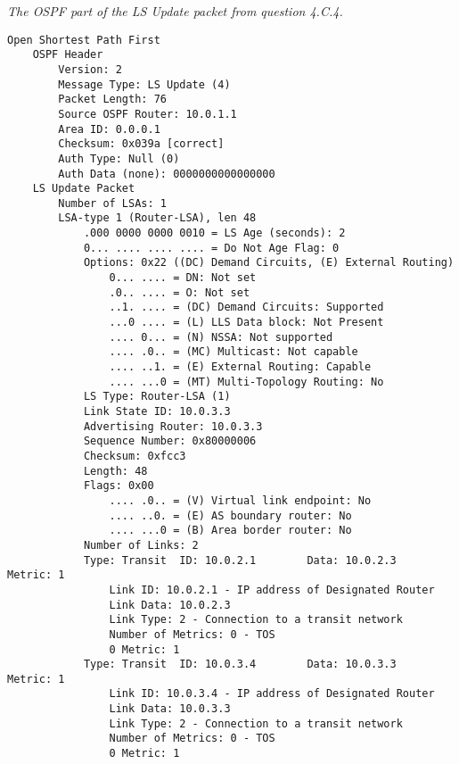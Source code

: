 \textit{The OSPF part of the LS Update packet from question 4.C.4.}
\begin{lstlisting}
Open Shortest Path First
    OSPF Header
        Version: 2
        Message Type: LS Update (4)
        Packet Length: 76
        Source OSPF Router: 10.0.1.1
        Area ID: 0.0.0.1
        Checksum: 0x039a [correct]
        Auth Type: Null (0)
        Auth Data (none): 0000000000000000
    LS Update Packet
        Number of LSAs: 1
        LSA-type 1 (Router-LSA), len 48
            .000 0000 0000 0010 = LS Age (seconds): 2
            0... .... .... .... = Do Not Age Flag: 0
            Options: 0x22 ((DC) Demand Circuits, (E) External Routing)
                0... .... = DN: Not set
                .0.. .... = O: Not set
                ..1. .... = (DC) Demand Circuits: Supported
                ...0 .... = (L) LLS Data block: Not Present
                .... 0... = (N) NSSA: Not supported
                .... .0.. = (MC) Multicast: Not capable
                .... ..1. = (E) External Routing: Capable
                .... ...0 = (MT) Multi-Topology Routing: No
            LS Type: Router-LSA (1)
            Link State ID: 10.0.3.3
            Advertising Router: 10.0.3.3
            Sequence Number: 0x80000006
            Checksum: 0xfcc3
            Length: 48
            Flags: 0x00
                .... .0.. = (V) Virtual link endpoint: No
                .... ..0. = (E) AS boundary router: No
                .... ...0 = (B) Area border router: No
            Number of Links: 2
            Type: Transit  ID: 10.0.2.1        Data: 10.0.2.3        Metric: 1
                Link ID: 10.0.2.1 - IP address of Designated Router
                Link Data: 10.0.2.3
                Link Type: 2 - Connection to a transit network
                Number of Metrics: 0 - TOS
                0 Metric: 1
            Type: Transit  ID: 10.0.3.4        Data: 10.0.3.3        Metric: 1
                Link ID: 10.0.3.4 - IP address of Designated Router
                Link Data: 10.0.3.3
                Link Type: 2 - Connection to a transit network
                Number of Metrics: 0 - TOS
                0 Metric: 1
\end{lstlisting}


